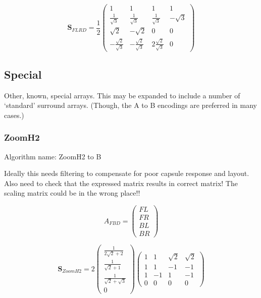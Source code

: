 \documentclass[12pt]{article}
\begin{document}
\begin{equation}	\label{eq:ab_flrd}
\mathbf{S}_{FLRD} = \frac{1}{2} \begin{pmatrix}
	1 & 1 & 1 & 1\\
	\frac{1}{\sqrt{3}} & \frac{1}{\sqrt{3}} & \frac{1}{\sqrt{3}} & -\sqrt{3}\\
	\sqrt{2} & -\sqrt{2} & 0 & 0\\
	-\frac{\sqrt{2}}{\sqrt{3}} & -\frac{\sqrt{2}}{\sqrt{3}} & 2\frac{\sqrt{2}}{\sqrt{3}} & 0 
\end{pmatrix}
\end{equation}


\subsection{Special}

Other, known, special arrays. This may be expanded to include a number of `standard' surround arrays. (Though, the A to B encodings are preferred in many cases.)

\subsubsection{ZoomH2}


Algorithm name: ZoomH2 to B

Ideally this needs filtering to compensate for poor capsule response and layout. Also need to check that the expressed matrix results in correct matrix! The scaling matrix could be in the wrong place!!


\begin{equation}	\label{eq:azoomh2_sig}
A_{FBD} = \begin{pmatrix}
	FL\\
	FR\\
	BL\\
	BR
\end{pmatrix}
\end{equation}


\begin{equation}	\label{eq:zoomh2}
\mathbf{S}_{ZoomH2} = 2 \begin{pmatrix}
	\frac{1}{2 \sqrt{2} + 2}\\
	\frac{1}{\sqrt{2} + 1}\\
	\frac{1}{\sqrt{2} + \sqrt{3}}\\
	0
\end{pmatrix} \begin{pmatrix}
	1 & 1 & \sqrt{2} & \sqrt{2}\\
	1 & 1 & -1 & -1\\
	1 & -1 & 1 & -1\\
	0 & 0 & 0 & 0
\end{pmatrix}
\end{equation}
\end{document}
